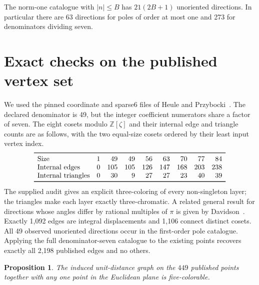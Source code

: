 \documentclass[11pt,letterpaper]{article}
\newtheorem{proposition}{Proposition}
\newcommand{\Z}{\mathbb Z}
\begin{document}
The norm-one catalogue with $|n|\le B$ has $21(2B+1)$
unoriented directions. In particular there are 63 directions
for poles of order at most one and 273 for denominators
dividing seven.

\section{Exact checks on the published vertex set}

We used the pinned coordinate and sparse6 files of Heule and
Przybocki~\cite{hp}. The declared denominator is 49, but the
integer coefficient numerators share a factor of seven. The
eight cosets modulo $\Z[\zeta]$ and their internal edge and
triangle counts are as follows, with the two equal-size
cosets ordered by their least input vertex index.
\[
\begin{array}{lrrrrrrrr}
\toprule
\text{Size} &1&49&49&56&63&70&77&84\\
\text{Internal edges}&0&105&105&126&147&168&203&238\\
\text{Internal triangles}&0&30&9&27&27&23&40&39\\
\bottomrule
\end{array}
\]
The supplied audit gives an explicit three-coloring of every
non-singleton layer; the triangles make each layer exactly
three-chromatic. A related general result for directions
whose angles differ by rational multiples of $\pi$ is given
by Davidson~\cite{davidson}. Exactly 1,092 edges are integral
displacements and 1,106 connect distinct cosets. All 49
observed unoriented directions occur in the first-order pole
catalogue. Applying the full denominator-seven catalogue to
the existing points recovers exactly all 2,198 published
edges and no others.

\newpage
\begin{proposition}
The induced unit-distance graph on the $449$ published points
together with any one point in the Euclidean plane is
five-colorable.
\end{proposition}
\end{document}
